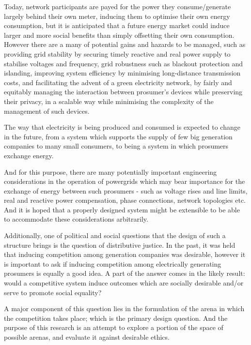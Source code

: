 Today, network participants are payed for the power they consume/generate largely behind their own meter, inducing them to optimise their own energy consumption, but it is anticipated that a future energy market could induce larger and more social benefits than simply offsetting their own consumption.
However there are a many of potential gains and hazards to be managed, such as providing grid stability by securing timely reactive and real power supply to stabilise voltages and frequency, grid robustness such as blackout protection and islanding, improving system efficiency by minimising long-distance transmission costs, and facilitating the advent of a green electricity network, by fairly and equitably managing the interaction between prosumer's devices while preserving their privacy, in a scalable way while minimising the complexity of the management of such devices. \cite{BELL2018765}

The way that electricity is being produced and consumed is expected to change in the future, from a system which supports the supply of few big generation companies to many small consumers, to being a system in which prosumers exchange energy.

And for this purpose, there are many potentially important engineering considerations in the operation of powergrids which may bear importance for the exchange of energy between such prosumers - such as voltage rises and line limits, real and reactive power compensation, phase connections, network topologies etc.
And it is hoped that a properly designed system might be extensible to be able to accommodate these considerations arbitrarily.

Additionally, one of political and social questions that the design of such a structure brings is the question of distributive justice.
In the past, it was held that inducing competition among generation companies was desirable, however it is important to ask if inducing competition among electrically generating prosumers is equally a good idea.
A part of the answer comes in the likely result: would a competitive system induce outcomes which are socially desirable and/or serve to promote social equality?

A major component of this question lies in the formulation of the arena in which the competition takes place; which is the primary design question.
And the purpose of this research is an attempt to explore a portion of the space of possible arenas, and evaluate it against desirable ethics.




